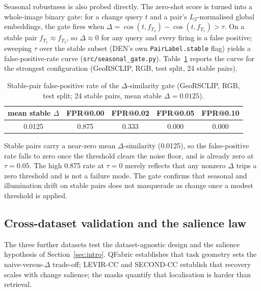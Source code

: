 \documentclass{article}
\begin{document}
Seasonal robustness is also probed directly. The zero-shot score is turned into a
whole-image binary gate: for a change query $t$ and a pair's $L_2$-normalised
global embeddings, the gate fires when
$\Delta = \cos(t, f_{T_2}) - \cos(t, f_{T_1}) > \tau$. On a stable pair
$f_{T_1} \approx f_{T_2}$, so $\Delta \approx 0$ for any query and every firing is
a false positive; sweeping $\tau$ over the stable subset (DEN's own
\texttt{PairLabel.stable} flag) yields a false-positive-rate curve
(\texttt{src/seasonal\_gate.py}). Table~\ref{tab:seasonalgate} reports the curve
for the strongest configuration (GeoRSCLIP, RGB, test split, 24 stable pairs).

\begin{table}[H]
    \centering
    \caption{Stable-pair false-positive rate of the $\Delta$-similarity gate
    (GeoRSCLIP, RGB, test split; 24 stable pairs, mean stable $\Delta = 0.0125$).}
    \label{tab:seasonalgate}
    \begin{tabular}{ccccc}
        \toprule
        \textbf{mean stable $\Delta$} & \textbf{FPR@0.00} & \textbf{FPR@0.02} & \textbf{FPR@0.05} & \textbf{FPR@0.10} \\
        \midrule
        0.0125 & 0.875 & 0.333 & 0.000 & 0.000 \\
        \bottomrule
    \end{tabular}
\end{table}

Stable pairs carry a near-zero mean $\Delta$-similarity (0.0125), so the
false-positive rate falls to zero once the threshold clears the noise floor, and
is already zero at $\tau = 0.05$. The high 0.875 rate at $\tau = 0$ merely
reflects that any nonzero $\Delta$ trips a zero threshold and is not a failure
mode. The gate confirms that seasonal and illumination drift on stable pairs does
not masquerade as change once a modest threshold is applied.

\subsection{Cross-dataset validation and the salience law}
\label{sec:crossdataset}

The three further datasets test the dataset-agnostic design and the salience
hypothesis of Section~\ref{sec:intro}. QFabric establishes that task geometry
sets the naive-versus-$\Delta$ trade-off; LEVIR-CC and SECOND-CC establish that
recovery scales with change salience; the masks quantify that localisation is
harder than retrieval.
\end{document}
